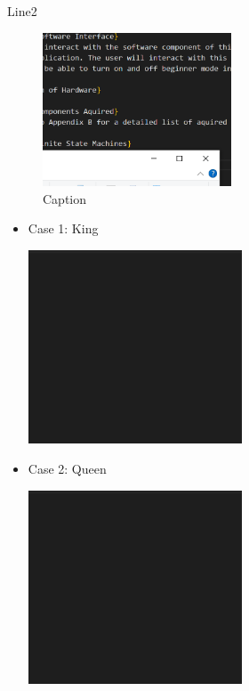 \documentclass[12pt, titlepage]{article}
\begin{document}
Line2
\begin{figure}[h]
  \centering
  \includegraphics[width=0.5\textwidth]{line2}
  \caption{Caption}
\end{figure}

\begin{itemize}
  \item Case 1: King 
  \begin{minipage}{\linewidth}
    \centering
    \includegraphics[width=0.5\textwidth]{king}
\end{minipage}
  \item Case 2: Queen   
  \begin{minipage}{\linewidth}
    \centering
    \includegraphics[width=0.5\textwidth]{queen}
\end{minipage}

\end{itemize}
\end{document}

